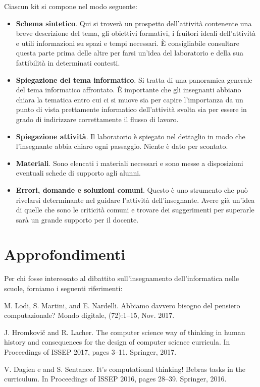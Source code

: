 \documentclass[12pt]{article}
\begin{document}
Ciascun kit si compone nel modo seguente:
\begin{itemize}
\item
\textbf{Schema sintetico}. Qui si troverà un prospetto dell'attività contenente una breve descrizione del tema, gli obiettivi formativi, i fruitori ideali dell'attività e utili informazioni su spazi e tempi necessari. È consigliabile consultare questa parte prima delle altre per farsi un'idea del laboratorio e della sua fattibilità in determinati contesti.
\item
\textbf{Spiegazione del tema informatico}. Si tratta di una panoramica generale del tema informatico affrontato. È importante che gli insegnanti abbiano chiara la tematica entro cui ci si muove sia per capire l'importanza da un punto di vista prettamente informatico dell'attività svolta sia per essere in grado di indirizzare correttamente il flusso di lavoro.
\item
\textbf{Spiegazione attività}. Il laboratorio è spiegato nel dettaglio in modo che l'insegnante abbia chiaro ogni passaggio. Niente è dato per scontato.
\item
\textbf{Materiali}. Sono elencati i materiali necessari e sono messe a disposizioni eventuali schede di supporto agli alunni.
\item
\textbf{Errori, domande e soluzioni comuni}. Questo è uno strumento che può rivelarsi determinante nel guidare l'attività dell'insegnante. Avere già un'idea di quelle che sono le criticità comuni e trovare dei suggerimenti per superarle sarà un grande supporto per il docente.
\end{itemize}
%
%
\section{Approfondimenti}
Per chi fosse interessato al dibattito sull'insegnamento dell'informatica nelle scuole, forniamo i seguenti riferimenti:

M. Lodi, S. Martini, and E. Nardelli. Abbiamo davvero bisogno del pensiero computazionale? Mondo digitale, (72):1–15, Nov. 2017.

J. Hromkovič and R. Lacher. The computer science way of thinking in human history and consequences for the design of computer science curricula. In Proceedings of ISSEP 2017, pages 3–11. Springer, 2017.

V. Dagien e and S. Sentance. It’s computational thinking! Bebras tasks in the curriculum. In Proceedings of ISSEP 2016, pages 28–39. Springer, 2016.
\end{document}
